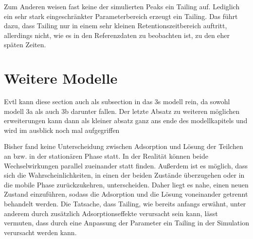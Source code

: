 Zum Anderen weisen fast keine der simulierten Peaks ein Tailing auf. Lediglich ein sehr stark eingeschränkter Parameterbereich erzeugt ein Tailing. Das führt dazu, dass Tailing nur in einem sehr kleinen Retentionszeitbereich auftritt, allerdings nicht, wie es in den Referenzdaten zu beobachten ist, zu den eher späten Zeiten.


\section{Weitere Modelle}

Evtl kann diese section auch als subsection in das 3s modell rein, da sowohl modell 3a als auch 3b darunter fallen. Der letzte Absatz zu 
weiteren möglichen erweiterungen kann dann als kleiner absatz ganz ans ende des modellkapitels und wird im ausblick noch mal aufgegriffen


Bisher fand keine Unterscheidung zwischen Adsorption und Lösung der Teilchen an bzw. in der stationären Phase statt. In der Realität können beide Wechselwirkungen parallel zueinander statt finden. Außerdem ist es möglich, dass sich die Wahrscheinlichkeiten, in einen der beiden Zustände überzugehen oder in die mobile Phase zurückzukehren, unterscheiden. Daher liegt es nahe, einen neuen Zustand einzuführen, sodass die Adsorption und die Lösung voneinander getrennt behandelt werden. Die Tatsache, dass Tailing, wie bereits anfangs erwähnt, unter anderem durch zusätzlich Adsorptionseffekte verursacht sein kann, lässt vermuten, dass durch eine Anpassung der Parameter ein Tailing in der Simulation verursacht werden kann. 
 
